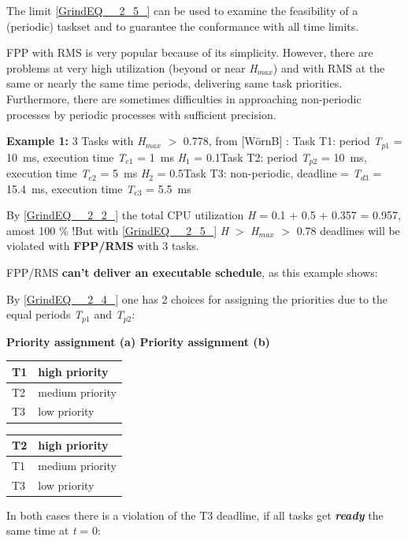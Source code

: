 The limit \eqref{GrindEQ__2_5_} can be used to examine the feasibility of a (periodic) taskset and to guarantee the conformance with all time limits.

FPP with RMS is very popular because of its simplicity. However, there are problems at very high utilization (beyond or near \textit{H${}_{max}$}) and with RMS at the same or nearly the same time periods, delivering same task priorities. Furthermore, there are sometimes difficulties in approaching non-periodic processes by periodic processes with sufficient precision.

\textbf{Example 1:} 3 Tasks with \textit{H}${}_{max}$ $\mathrm{>}$ 0.778, from [W\"{o}rnB] : Task T1: period \textit{T}${}_{p1}$ = 10~ms, execution time \textit{T}${}_{e1}$ = 1~ms  \textit{H}${}_{1}$ = 0.1Task T2: period \textit{T}${}_{p2}$ = 10~ms, execution time\textit{ T}${}_{e2}$ = 5~ms  \textit{H}${}_{2}$ = 0.5Task T3: non-periodic, deadline = \textit{T}${}_{d3}$ = 15.4~ms, execution time\textit{ T}${}_{e3}$ = 5.5~ms

By \eqref{GrindEQ__2_2_} the total CPU utilization \textit{H} = 0.1 + 0.5 + 0.357 = 0.957, amost 100 \% !But with \eqref{GrindEQ__2_5_} \textit{H} $\mathrm{>}$ \textit{H}${}_{max}$ $\mathrm{>}$ 0.78 deadlines will be violated with \textbf{FPP/RMS} with 3 tasks. 

FPP/RMS \textbf{can't deliver an executable schedule}, as this example shows:

By \eqref{GrindEQ__2_4_} one has 2 choices for assigning the priorities due to the equal periods \textit{T}${}_{p1}$\textit{ }and \textit{T}${}_{p2}$:

\textbf{Priority assignment (a)   Priority assignment (b)}

\begin{tabular}{|p{0.5in}|p{0.9in}|} \hline 
T1 & high priority \\ \hline 
T2 & medium priority \\ \hline 
T3 & low priority \\ \hline 
\end{tabular}

\begin{tabular}{|p{0.2in}|p{0.9in}|} \hline 
T2 & high  priority \\ \hline 
T1 & medium priority \\ \hline 
T3 & low priority \\ \hline 
\end{tabular}

In both cases there is a violation of the T3 deadline, if all tasks get \textbf{\textit{ready}} the same time at \textit{t} = 0: 


